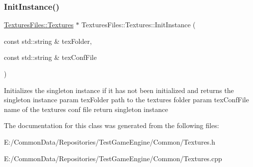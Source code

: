 \subsubsection{\texorpdfstring{InitInstance()}{InitInstance()}}
{\footnotesize\ttfamily \mbox{\hyperlink{class_textures_files_1_1_textures}{Textures\+Files\+::\+Textures}} $\ast$ Textures\+Files\+::\+Textures\+::\+Init\+Instance (\begin{DoxyParamCaption}\item[{const std\+::string \&}]{tex\+Folder,  }\item[{const std\+::string \&}]{tex\+Conf\+File }\end{DoxyParamCaption})\hspace{0.3cm}{\ttfamily [static]}}

Initializes the singleton instance if it has not been initialized and returns the singleton instance param tex\+Folder path to the textures folder param tex\+Conf\+File name of the textures conf file return singleton instance 

The documentation for this class was generated from the following files\+:\begin{DoxyCompactItemize}
\item 
E\+:/\+Common\+Data/\+Repositories/\+Test\+Game\+Engine/\+Common/Textures.\+h\item 
E\+:/\+Common\+Data/\+Repositories/\+Test\+Game\+Engine/\+Common/Textures.\+cpp\end{DoxyCompactItemize}
